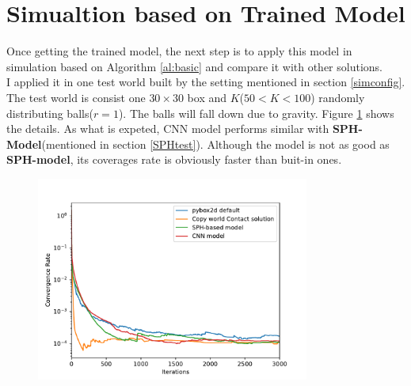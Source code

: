 \section{Simualtion based on Trained Model}
Once getting the trained model, the next step is to apply this model in simulation based on Algorithm \ref{al:basic} and compare it with other solutions.\\

I applied it in one test world built by the setting mentioned in section \ref{simconfig}. The test world is consist one $30 \times 30 $ box and $K$($50<K<100$) randomly distributing balls($r=1$). The balls will fall down due to gravity. Figure \ref{testoneworld} shows the details. As what is expeted, CNN model performs similar with \textbf{SPH-Model}(mentioned in section \ref{SPHtest}). Although the model is not as good as \textbf{SPH-model}, its coverages rate is obviously faster than buit-in ones. 
\begin{figure}
    \centering
    \includegraphics[width=0.8\textwidth]{Figures/same_world.pdf}
    \caption{}
    \label{testoneworld}
\end{figure}
